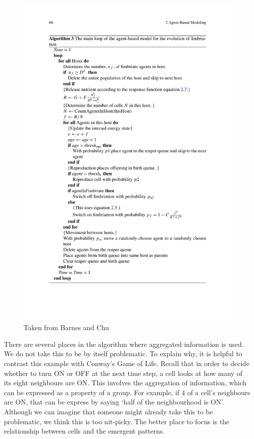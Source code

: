 \documentclass[11pt]{article}
\begin{document}
\begin{figure}
\label{abmalg}
\includegraphics[width = 4.5in]{abmofevofimalgorithm}
\caption{Taken from Barnes and Chu}
\end{figure}

There are several places in the algorithm where aggregated information is used. We do not take this to be by itself problematic.  To explain why, it is helpful to contrast this example with Conway's Game of Life. Recall that in order to decide whether to turn ON or OFF at the next time step, a cell looks at how many of its eight neighbours are ON. This involves the aggregation of information, which can be expressed as a property of a group. For example, if 4 of a cell's neighbours are ON, that can be express by saying `half of the neighbourhood is ON'. Although we can imagine that someone might already take this to be problematic, we think this is too nit-picky.  The better place to focus is the relationship between cells and the emergent patterns.
\end{document}
